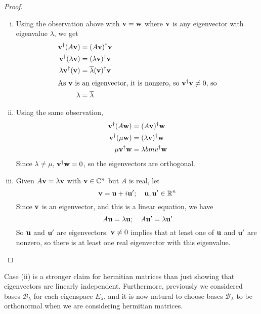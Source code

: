 \begin{proof}
	\begin{enumerate}[(i)]
		\item Using the observation above with \(\vb v = \vb w\) where \(\vb v\) is any eigenvector with eigenvalue \(\lambda\), we get
		      \begin{align*}
			      \vb v^\dagger (A\vb v)        & = (A\vb v)^\dagger \vb v                   \\
			      \vb v^\dagger (\lambda\vb v)  & = (\lambda\vb v)^\dagger \vb v             \\
			      \lambda \vb v^\dagger (\vb v) & = \overline{\lambda} (\vb v)^\dagger \vb v \\
			      \intertext{As \(\vb v\) is an eigenvector, it is nonzero, so \(\vb v^\dagger \vb v \neq 0\), so}
			      \lambda                       & = \overline \lambda
		      \end{align*}
		\item Using the same observation,
		      \begin{align*}
			      \vb v^\dagger (A \vb w)   & = (A \vb v)^\dagger \vb w       \\
			      \vb v^\dagger (\mu \vb w) & = (\lambda \vb v)^\dagger \vb w \\
			      \mu \vb v^\dagger \vb w   & = \lambda bm v^\dagger \vb w
		      \end{align*}
		      Since \(\lambda \neq \mu\), \(\vb v^\dagger \vb w = 0\), so the eigenvectors are orthogonal.
		\item Given \(A\vb v = \lambda \vb v\) with \(\vb v \in \mathbb C^n\) but \(A\) is real, let
		      \[
			      \vb v = \vb u + i\vb u';\quad \vb u, \vb u' \in \mathbb R^n
		      \]
		      Since \(\vb v\) is an eigenvector, and this is a linear equation, we have
		      \[
			      A\vb u = \lambda \vb u;\quad A\vb u' = \lambda \vb u'
		      \]
		      So \(\vb u\) and \(\vb u'\) are eigenvectors.
		      \(\vb v \neq 0\) implies that at least one of \(\vb u\) and \(\vb u'\) are nonzero, so there is at least one real eigenvector with this eigenvalue.
	\end{enumerate}
\end{proof}
Case (ii) is a stronger claim for hermitian matrices than just showing that eigenvectors are linearly independent.
Furthermore, previously we considered bases \(\mathcal B_\lambda\) for each eigenspace \(E_\lambda\), and it is now natural to choose bases \(\mathcal B_\lambda\) to be orthonormal when we are considering hermitian matrices.
